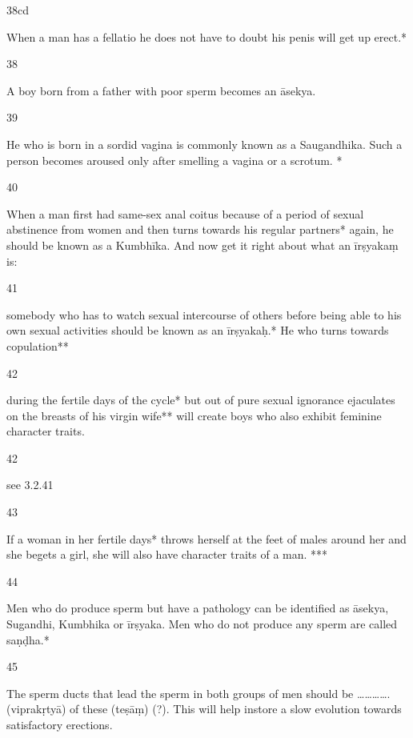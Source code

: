 \begin{translation}
\begin{tt}
\item[38cd]

When a man has a fellatio he does not have to doubt his penis will get 
  up erect.*
  
\item[38]

 A boy born from a father with poor sperm becomes an āsekya.
  
\item[39]

 He who is born in a sordid vagina is commonly known as a Saugandhika. 
  Such a person becomes aroused only after smelling a vagina or a scrotum. *
  
\item[40]

 When a man first had same-sex anal coitus because of a period of 
  sexual abstinence from women and then turns towards his regular partners* 
  again, he should be known as a Kumbhīka. And now get it right about what an 
  īrṣyakaṃ is:
  
\item[41]

 somebody who has to watch sexual intercourse of others before being 
  able to his own sexual activities should be known as an  īrṣyakaḥ.* He who 
  turns towards copulation**
  
\item[42]

 during the fertile days of the cycle* but out of pure sexual ignorance 
  ejaculates on the breasts of his virgin wife** will create boys who also exhibit 
  feminine character traits.
  
\item[42]

see 3.2.41
  
\item[43]

 If a woman in her fertile days* throws herself at the feet of males 
  around her and she begets a girl, she will also have character traits of a man. 
  *** 
  
\item[44]

Men who do produce sperm but have a pathology can be identified as 
  āsekya, Sugandhi, Kumbhika or īrṣyaka. Men who do not produce any sperm 
  are called saṇḍha.*
  
\item[45]

The sperm ducts that lead the sperm in both groups of men should be 
  …………. (viprakṛtyā) of these (teṣāṃ) (?). This will help instore a slow evolution 
  towards satisfactory erections. 
  

\end{tt}
\end{translation}

